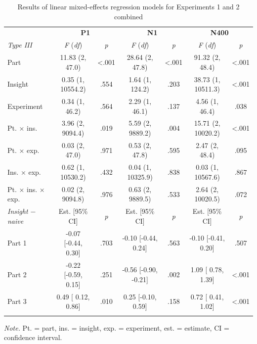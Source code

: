 \documentclass[
  english,
  man,floatsintext]{apa7}
\begin{document}
\begin{table}[tbp]

\begin{center}
\begin{threeparttable}

\caption{\label{tab:joint-output}Results of linear mixed-effects regression models for Experiments 1 and 2 combined}

\footnotesize{

\begin{tabular}{lcccccc}
\toprule
 & \multicolumn{2}{c}{\textbf{P1}} & \multicolumn{2}{c}{\textbf{N1}} & \multicolumn{2}{c}{\textbf{N400}} \\
\cmidrule(r){2-3} \cmidrule(r){4-5} \cmidrule(r){6-7}
\textit{Type III} & \textit{F} (\textit{df}) & \textit{p} & \textit{F} (\textit{df}) & \textit{p} & \textit{F} (\textit{df}) & \textit{p}\\
\midrule
Part & 11.83 (2,    47.0) & <.001 & 28.64 (2,    47.8) & <.001 & 91.32 (2,    48.4) & <.001\\
Insight & 0.35 (1, 10554.2) & .554 & 1.64 (1,   124.2) & .203 & 38.73 (1, 10511.3) & <.001\\
Experiment & 0.34 (1,    46.2) & .564 & 2.29 (1,    46.1) & .137 & 4.56 (1,    46.4) & .038\\
Pt. × ins. & 3.96 (2,  9094.4) & .019 & 5.59 (2,  9889.2) & .004 & 15.71 (2, 10020.2) & <.001\\
Pt. × exp. & 0.03 (2,    47.0) & .971 & 0.53 (2,    47.8) & .595 & 2.47 (2,    48.4) & .095\\
Ins. × exp. & 0.62 (1, 10530.2) & .432 & 0.04 (1, 10325.9) & .838 & 0.03 (1, 10567.6) & .867\\
Pt. × ins. × exp. & 0.02 (2,  9094.8) & .976 & 0.63 (2,  9889.5) & .533 & 2.64 (2, 10020.5) & .072\\
\textit{Insight $-$  naive} & Est. [95\% CI] & \textit{p} & Est. [95\% CI] & \textit{p} & Est. [95\% CI] & \textit{p}\\ \midrule
Part 1 & -0.07 [-0.44, 0.30] & .703 & -0.10 [-0.44,  0.24] & .563 & -0.10 [-0.41, 0.20] & .507\\
Part 2 & -0.22 [-0.59, 0.15] & .251 & -0.56 [-0.90, -0.21] & .002 & 1.09 [ 0.78, 1.39] & <.001\\
Part 3 & 0.49 [ 0.12, 0.86] & .010 & 0.25 [-0.10,  0.59] & .158 & 0.72 [ 0.41, 1.02] & <.001\\
\bottomrule
\addlinespace
\end{tabular}

}

\begin{tablenotes}[para]
\normalsize{\textit{Note.} Pt. = part, ins. = insight, exp. = experiment, est. = estimate, CI = confidence interval.}
\end{tablenotes}

\end{threeparttable}
\end{center}

\end{table}
\end{document}
